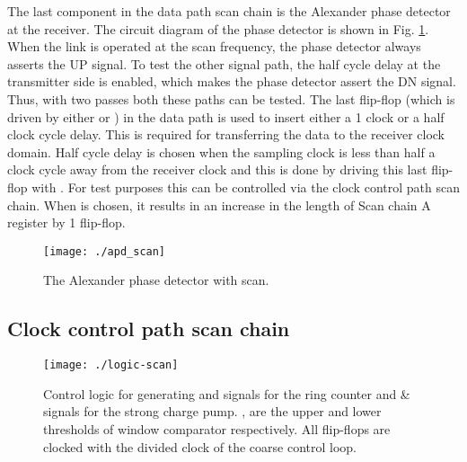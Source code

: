 \documentclass[conference]{IEEEtran}
\begin{document}
The last component in the data path scan chain is the Alexander phase
detector at the receiver. The circuit diagram of the phase detector is shown in
Fig. \ref{fig:apd-scan}. When the link is operated at the scan frequency,
the phase detector always asserts the UP signal. To test the other signal path,
the half cycle delay at the transmitter side is enabled, which makes the phase
detector assert the DN signal. Thus, with two passes both these paths
can be tested. The last flip-flop (which is driven
by either  or ) in the data path is 
used to insert either a 1 clock or a half clock cycle delay.
This is required for transferring the
data to the receiver clock domain. Half cycle delay is chosen when the 
sampling clock is less than half
a clock cycle away from the receiver clock and this is done
by driving this last flip-flop with .
For test purposes this can be
controlled via the clock control path scan chain.
When  is chosen, it results in an increase in the length of 
Scan chain A register by 1 flip-flop.

\begin{figure}
\centering
{}
\texttt{[image: ./apd\_scan]}
\caption{The Alexander phase detector with scan.}
\label{fig:apd-scan}
\end{figure}

\subsection{Clock control path scan chain}

\begin{figure*}[h]
\centering
\texttt{[image: ./logic-scan]}
\caption{Control logic for generating 
and  signals for the ring counter and 
 \&  signals
for the strong charge pump. ,  are the
upper and lower thresholds of window comparator respectively. All
flip-flops are clocked with the divided clock of the coarse control
loop.}
\label{fig:logic}
\end{figure*}
\end{document}
